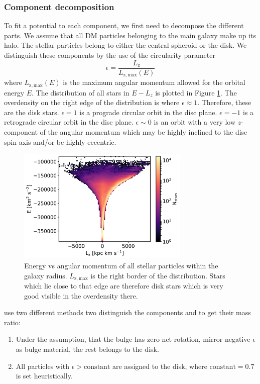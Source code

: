 \subsubsection{Component decomposition}\label{subsubsec:decomp}
To fit a potential to each component, we first need to decompose the different parts. We assume that all \ac{DM} particles belonging to the main galaxy make up its halo. The stellar particles belong to either the central spheroid or the disk. We distinguish these components by the use of the circularity parameter \citep{Abadi...circularity...2003}
\begin{equation}\label{eq:circularity}
    \epsilon = \frac{L_\mathrm{z}}{L_\mathrm{z,max}(E)}
\end{equation}
where $L_\mathrm{z,max}(E)$ is the maximum angular momentum allowed for the orbital energy $E$. The distribution of all stars in $E-L_z$ is plotted in Figure \ref{fig:e_lz_dist}. The overdensity on the right edge of the distribution is where $\epsilon \approx 1$. Therefore, these are the disk stars.
$\epsilon = 1$ is a prograde circular orbit in the disc plane. $\epsilon = -1$ is a retrograde circular orbit in the disc plane. $\epsilon \sim 0$ is an orbit with a very low $z$-component of the angular momentum which may be highly inclined to the disc spin axis and/or be highly eccentric.  
\begin{figure}
\captionsetup{format=plain}
    \centering
    \includegraphics[width = 0.73\textwidth]{plots/Auriga/decomposition_elz_snap_127.png}
    \caption{Energy vs angular momentum of all stellar particles within the galaxy radius. $L_\mathrm{z,max}$ is the right border of the distribution. Stars which lie close to that edge are therefore disk stars which is very good visible in the overdensity there.}
    \label{fig:e_lz_dist}
\end{figure}

 use two different methods two distinguish the components and to get their mass ratio:
\begin{enumerate}
\item Under the assumption, that the bulge has zero net rotation, mirror negative $\epsilon$ as bulge material, the rest belongs to the disk.
\item All particles with $\epsilon > \mathrm{constant}$ are assigned to the disk, where $\mathrm{constant} = 0.7$ is set heuristically.
\end{enumerate}

